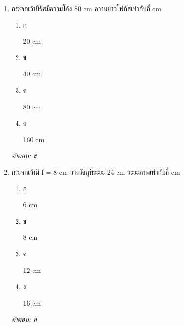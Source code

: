 \documentclass[12pt]{article}
\begin{document}
\begin{enumerate}[label=\arabic*., itemsep=0.5\baselineskip, topsep=0.5\baselineskip, leftmargin=*]
\item กระจกเว้ามีรัศมีความโค้ง 80 cm ความยาวโฟกัสเท่ากับกี่ cm
\begin{enumerate}[label=\alph*)., itemsep=0.3\baselineskip, topsep=0.3\baselineskip]
\item ก\ 
\begin{minipage}[t]{0.9\linewidth}
\raggedright 20 cm
\end{minipage}
\item ข\ 
\begin{minipage}[t]{0.9\linewidth}
\raggedright 40 cm
\end{minipage}
\item ค\ 
\begin{minipage}[t]{0.9\linewidth}
\raggedright 80 cm
\end{minipage}
\item ง\ 
\begin{minipage}[t]{0.9\linewidth}
\raggedright 160 cm
\end{minipage}
\end{enumerate}
\vspace{-0.3\baselineskip}
\begin{small}
\textit{คำตอบ: ข}
\end{small}

\item กระจกเว้ามี f = 8 cm วางวัตถุที่ระยะ 24 cm ระยะภาพเท่ากับกี่ cm
\begin{enumerate}[label=\alph*)., itemsep=0.3\baselineskip, topsep=0.3\baselineskip]
\item ก\ 
\begin{minipage}[t]{0.9\linewidth}
\raggedright 6 cm
\end{minipage}
\item ข\ 
\begin{minipage}[t]{0.9\linewidth}
\raggedright 8 cm
\end{minipage}
\item ค\ 
\begin{minipage}[t]{0.9\linewidth}
\raggedright 12 cm
\end{minipage}
\item ง\ 
\begin{minipage}[t]{0.9\linewidth}
\raggedright 16 cm
\end{minipage}
\end{enumerate}
\vspace{-0.3\baselineskip}
\begin{small}
\textit{คำตอบ: ค}
\end{small}


\end{enumerate}
\end{document}
